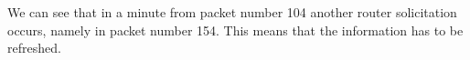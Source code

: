 We can see that in a minute from packet number 104 another router solicitation occurs, namely in packet number 154. This means that the information has to be refreshed.